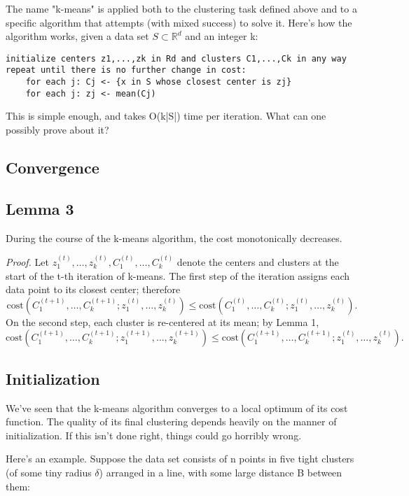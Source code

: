 \documentclass{article}
\begin{document}
The name "k-means" is applied both to the clustering task defined above and to a specific algorithm that attempts (with mixed success) to solve it. Here's how the algorithm works, given a data set $S \subset \mathbb{R}^d$ and an integer k:
\begin{verbatim}
initialize centers z1,...,zk in Rd and clusters C1,...,Ck in any way
repeat until there is no further change in cost:
    for each j: Cj <- {x in S whose closest center is zj}
    for each j: zj <- mean(Cj)
\end{verbatim}
This is simple enough, and takes O(k|S|) time per iteration. What can one possibly prove about it?

\subsection{Convergence}

\subsection*{Lemma 3}
During the course of the k-means algorithm, the cost monotonically decreases.

\textit{Proof.} Let $z_1^{(t)}, \dots, z_k^{(t)}, C_1^{(t)}, \dots, C_k^{(t)}$ denote the centers and clusters at the start of the t-th iteration of k-means. The first step of the iteration assigns each data point to its closest center; therefore
\[ \text{cost}(C_1^{(t+1)}, \dots, C_k^{(t+1)}; z_1^{(t)}, \dots, z_k^{(t)}) \le \text{cost}(C_1^{(t)}, \dots, C_k^{(t)}; z_1^{(t)}, \dots, z_k^{(t)}). \]
On the second step, each cluster is re-centered at its mean; by Lemma 1,
\[ \text{cost}(C_1^{(t+1)}, \dots, C_k^{(t+1)}; z_1^{(t+1)}, \dots, z_k^{(t+1)}) \le \text{cost}(C_1^{(t+1)}, \dots, C_k^{(t+1)}; z_1^{(t)}, \dots, z_k^{(t)}). \]

\subsection{Initialization}

We've seen that the k-means algorithm converges to a local optimum of its cost function. The quality of its final clustering depends heavily on the manner of initialization. If this isn't done right, things could go horribly wrong.

Here's an example. Suppose the data set consists of n points in five tight clusters (of some tiny radius $\delta$) arranged in a line, with some large distance B between them:
\end{document}
